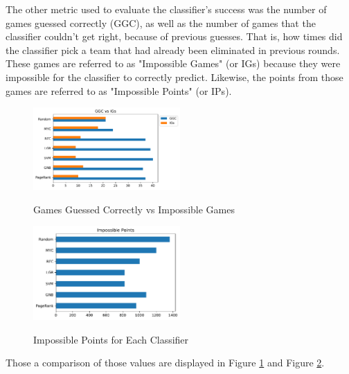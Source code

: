 The other metric used to evaluate the classifier's success was the number of games guessed correctly (GGC), as well as the number of games that the classifier couldn't get right, because of previous guesses.  
That is, how times did the classifier pick a team that had already been eliminated in previous rounds.  
These games are referred to as "Impossible Games" (or IGs) because they were impossible for the classifier to correctly predict.  
Likewise, the points from those games are referred to as "Impossible Points" (or IPs).  
\begin{figure}[h!]
\centering
\caption{Games Guessed Correctly vs Impossible Games}
\includegraphics[height=0.35\textwidth,width=0.5\textwidth]{../GGC_vs_IGs.pdf}
\label{fig:istats1}
\end{figure}
\begin{figure}[h!]
\centering
\caption{Impossible Points for Each Classifier}
\includegraphics[height=0.35\textwidth,width=0.5\textwidth]{../Impossible_Points.pdf}
\label{fig:istats2}
\end{figure}
Those a comparison of those values are displayed in Figure \ref{fig:istats1} and Figure \ref{fig:istats2}.\newline\newline
